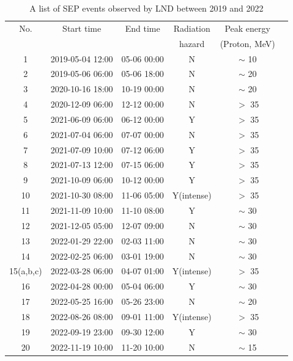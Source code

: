 \begin{table}[!tbhp]
    \centering
    \caption[\acs{LND} \acs{SEP} events lists]{A list of \ac{SEP} events observed by \ac{LND} between 2019 and 2022}
\begin{tabular}{cccccc}
    \hline
    No.     &  Start time    & End time      & Radiation  & Peak energy \\
            &                &               & hazard      & (Proton, MeV)\\
    \hline
    1       &   2019-05-04 12:00 & 05-06 00:00               & N  & $\sim$ 10\\
    2       &   2019-05-06 06:00 & 05-06 18:00              & N  & $\sim$ 20 \\
    3       &   2020-10-16 18:00 & 10-19 00:00             & N  & $\sim$ 20 \\
    4       &   2020-12-09 06:00 & 12-12 00:00             & N  & $>$ 35 \\    
    5       &   2021-06-09 06:00 & 06-12 00:00             & Y  & $>$ 35 \\
    6       &   2021-07-04 06:00 & 07-07 00:00             & N  & $>$ 35 \\
    7       &   2021-07-09 10:00 & 07-12 06:00             & Y  & $>$ 35 \\
    8       &   2021-07-13 12:00 & 07-15 06:00             & Y  & $>$ 35 \\
    9       &   2021-10-09 06:00 & 10-12 00:00             & Y  & $>$ 35 \\
    10      &   2021-10-30 08:00 & 11-06 05:00             & Y(intense)  & $>$ 35\\
    11      &   2021-11-09 10:00 & 11-10 08:00             & Y  & $\sim$ 30 \\
    12      &   2021-12-05 05:00 & 12-07 09:00             & N  & $\sim$ 30 \\
    13      &   2022-01-29 22:00 & 02-03 11:00             & N  & $\sim$ 30 \\
    14      &   2022-02-25 06:00 & 03-01 19:00             & N  & $\sim$ 30 \\
    15(a,b,c) & 2022-03-28 06:00 & 04-07 01:00             & Y(intense)  & $>$ 35 \\
    16      &    2022-04-28 00:00 & 05-04 06:00             & Y  & $\sim$ 30 \\
    17      &   2022-05-25 16:00 & 05-26 23:00             & N  & $\sim$ 20\\
    18      &   2022-08-26 08:00 & 09-01 11:00             & Y(intense)  & $>$ 35 \\
    19      &   2022-09-19 23:00 & 09-30 12:00             & Y  & $\sim$ 30 \\
    20      &   2022-11-19 10:00 & 11-20 10:00             & N  & $\sim$ 15 \\
    \hline
\end{tabular}
\label{Tab:appendix_LND_SEP_list}
\end{table}



